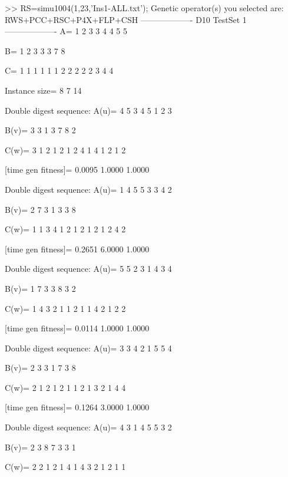 >> RS=simu1004(1,23,'Ins1-ALL.txt');
Genetic operator(s) you selected are:
RWS+PCC+RSC+P4X+FLP+CSH
------------------- D10 TestSet 1 -------------------
A=
     1     2     3     3     4     4     5     5

B=
     1     2     3     3     3     7     8

C=
     1     1     1     1     1     1     2     2     2     2     2     3     4     4

Instance size=
     8     7    14

Double digest sequence:
A(u)=
     4     5     3     4     5     1     2     3

B(v)=
     3     3     1     3     7     8     2

C(w)=
     3     1     2     1     2     1     2     4     1     4     1     2     1     2

[time gen fitness]=
    0.0095    1.0000    1.0000

Double digest sequence:
A(u)=
     1     4     5     5     3     3     4     2

B(v)=
     2     7     3     1     3     3     8

C(w)=
     1     1     3     4     1     2     1     2     1     2     1     2     4     2

[time gen fitness]=
    0.2651    6.0000    1.0000

Double digest sequence:
A(u)=
     5     5     2     3     1     4     3     4

B(v)=
     1     7     3     3     8     3     2

C(w)=
     1     4     3     2     1     1     2     1     1     4     2     1     2     2

[time gen fitness]=
    0.0114    1.0000    1.0000

Double digest sequence:
A(u)=
     3     3     4     2     1     5     5     4

B(v)=
     2     3     3     1     7     3     8

C(w)=
     2     1     2     1     2     1     1     2     1     3     2     1     4     4

[time gen fitness]=
    0.1264    3.0000    1.0000

Double digest sequence:
A(u)=
     4     3     1     4     5     5     3     2

B(v)=
     2     3     8     7     3     3     1

C(w)=
     2     2     1     2     1     4     1     4     3     2     1     2     1     1

